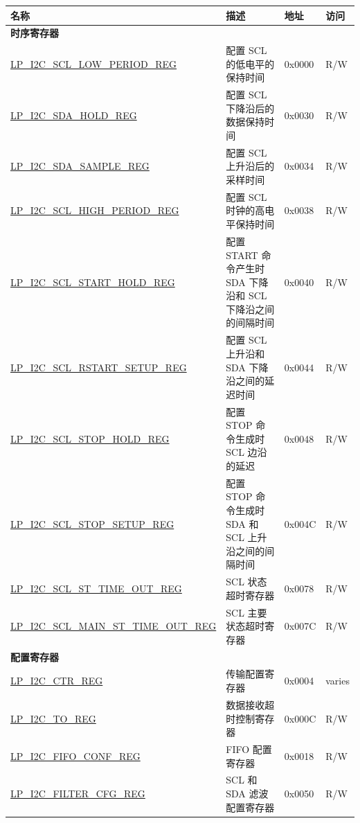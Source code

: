 \begin{longtable}{ | p{6cm} | p{7cm} | p{1.3cm} | p{1cm} | }
\hline\rowcolor{lightgray}
名称 & 描述 &  地址 & 访问 \\ \hline
\endhead
\multicolumn{4}{|l|}{\textbf{时序寄存器}} \\ \hline
\hyperref[regdesc:LPI2CSCLLOWPERIODREG]{LP\_I2C\_SCL\_LOW\_PERIOD\_REG} & 配置 SCL 的低电平的保持时间 & 0x0000 & R/W \\ \hline
\hyperref[regdesc:LPI2CSDAHOLDREG]{LP\_I2C\_SDA\_HOLD\_REG} & 配置 SCL 下降沿后的数据保持时间 & 0x0030 & R/W \\ \hline
\hyperref[regdesc:LPI2CSDASAMPLEREG]{LP\_I2C\_SDA\_SAMPLE\_REG} & 配置 SCL 上升沿后的采样时间 & 0x0034 & R/W \\ \hline
\hyperref[regdesc:LPI2CSCLHIGHPERIODREG]{LP\_I2C\_SCL\_HIGH\_PERIOD\_REG} & 配置 SCL 时钟的高电平保持时间 & 0x0038 & R/W \\ \hline
\hyperref[regdesc:LPI2CSCLSTARTHOLDREG]{LP\_I2C\_SCL\_START\_HOLD\_REG} & 配置 START 命令产生时 SDA 下降沿和 SCL 下降沿之间的间隔时间 & 0x0040 & R/W \\ \hline
\hyperref[regdesc:LPI2CSCLRSTARTSETUPREG]{LP\_I2C\_SCL\_RSTART\_SETUP\_REG} & 配置 SCL 上升沿和 SDA 下降沿之间的延迟时间 & 0x0044 & R/W \\ \hline
\hyperref[regdesc:LPI2CSCLSTOPHOLDREG]{LP\_I2C\_SCL\_STOP\_HOLD\_REG} & 配置 STOP 命令生成时 SCL 边沿的延迟 & 0x0048 & R/W \\ \hline
\hyperref[regdesc:LPI2CSCLSTOPSETUPREG]{LP\_I2C\_SCL\_STOP\_SETUP\_REG} & 配置 STOP 命令生成时 SDA 和 SCL 上升沿之间的间隔时间 & 0x004C & R/W \\ \hline
\hyperref[regdesc:LPI2CSCLSTTIMEOUTREG]{LP\_I2C\_SCL\_ST\_TIME\_OUT\_REG} & SCL 状态超时寄存器 & 0x0078 & R/W \\ \hline
\hyperref[regdesc:LPI2CSCLMAINSTTIMEOUTREG]{LP\_I2C\_SCL\_MAIN\_ST\_TIME\_OUT\_REG} & SCL 主要状态超时寄存器 & 0x007C & R/W \\ \hline
\multicolumn{4}{|l|}{\textbf{配置寄存器}} \\ \hline
\hyperref[regdesc:LPI2CCTRREG]{LP\_I2C\_CTR\_REG} & 传输配置寄存器 & 0x0004 & varies \\ \hline
\hyperref[regdesc:LPI2CTOREG]{LP\_I2C\_TO\_REG} & 数据接收超时控制寄存器 & 0x000C & R/W \\ \hline
\hyperref[regdesc:LPI2CFIFOCONFREG]{LP\_I2C\_FIFO\_CONF\_REG} & FIFO 配置寄存器 & 0x0018 & R/W \\ \hline
\hyperref[regdesc:LPI2CFILTERCFGREG]{LP\_I2C\_FILTER\_CFG\_REG} & SCL 和 SDA 滤波配置寄存器 & 0x0050 & R/W \\ \hline

\end{longtable}
